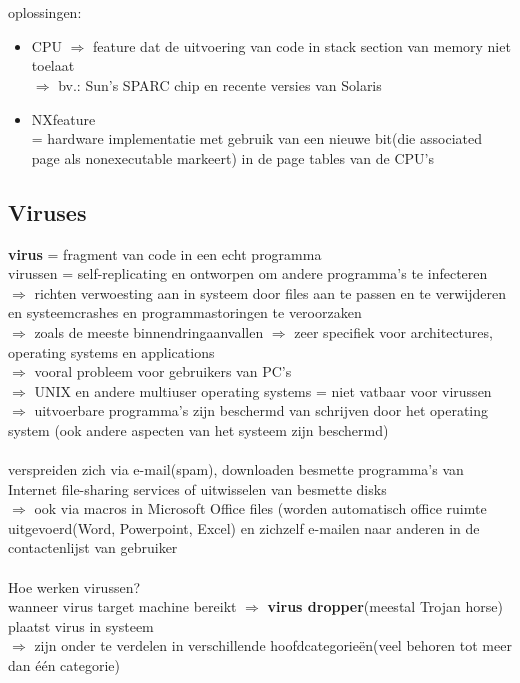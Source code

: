 \documentclass{report}
\begin{document}
\\
\\oplossingen: 
\begin{itemize}
\item CPU $\Rightarrow$ feature dat de uitvoering van code in stack section van memory niet toelaat 
\\ $\Rightarrow$ bv.: Sun's SPARC chip en recente versies van Solaris
\item NXfeature
\\= hardware implementatie met gebruik van een nieuwe bit(die associated page als nonexecutable markeert) in de page tables van de CPU's
\end{itemize}

\subsection{Viruses}
\textbf{virus} = fragment van code in een echt programma
\\virussen = self-replicating en ontworpen om andere programma's te infecteren
\\$\Rightarrow$ richten verwoesting aan in systeem door files aan te passen en te verwijderen en systeemcrashes en programmastoringen te veroorzaken
\\$\Rightarrow$ zoals de meeste binnendringaanvallen $\Rightarrow$ zeer specifiek voor architectures, operating systems en applications
\\$\Rightarrow$ vooral probleem voor gebruikers van PC's
\\ $\Rightarrow$ UNIX en andere multiuser operating systems = niet vatbaar voor virussen $\Rightarrow$ uitvoerbare programma's zijn beschermd van schrijven door het operating system (ook andere aspecten van het systeem zijn beschermd)
\\
\\verspreiden zich via e-mail(spam), downloaden besmette programma's van Internet file-sharing services of  uitwisselen van besmette disks
\\$\Rightarrow$ ook via macros in Microsoft Office files (worden automatisch office ruimte uitgevoerd(Word, Powerpoint, Excel) en zichzelf e-mailen naar anderen in de contactenlijst van gebruiker
\\
\\Hoe werken virussen?
\\wanneer virus target machine bereikt $\Rightarrow$ \textbf{virus dropper}(meestal Trojan horse) plaatst virus in systeem
\\$\Rightarrow$ zijn onder te verdelen in verschillende hoofdcategorie\"en(veel behoren tot meer dan \'e\'en categorie)
\end{document}
